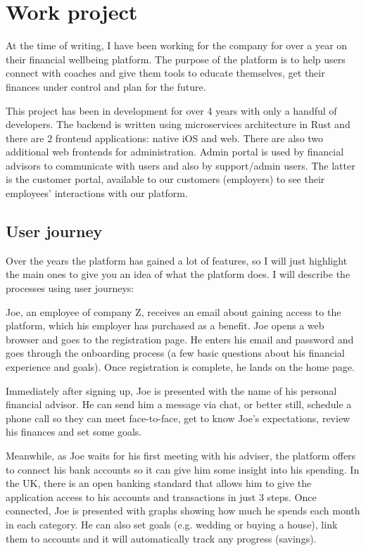 \section{Work project}
At the time of writing, I have been working for the company for over a year on their financial wellbeing platform. The purpose of the platform is to help users connect with coaches and give them tools to educate themselves, get their finances under control and plan for the future.

This project has been in development for over 4 years with only a handful of developers. The backend is written using microservices architecture in Rust and there are 2 frontend applications: native iOS and web. There are also two additional web frontends for administration. Admin portal is used by financial advisors to communicate with users and also by support/admin users. The latter is the customer portal, available to our customers (employers) to see their employees' interactions with our platform.

\subsection{User journey}
Over the years the platform has gained a lot of features, so I will just highlight the main ones to give you an idea of what the platform does. I will describe the processes using user journeys:

\begin{example}[Sign Up]
    Joe, an employee of company Z, receives an email about gaining access to the platform, which his employer has purchased as a benefit. Joe opens a web browser and goes to the registration page. He enters his email and password and goes through the onboarding process (a few basic questions about his financial experience and goals). Once registration is complete, he lands on the home page.
\end{example}

\begin{example}[Advisor]
    Immediately after signing up, Joe is presented with the name of his personal financial advisor. He can send him a message via chat, or better still, schedule a phone call so they can meet face-to-face, get to know Joe's expectations, review his finances and set some goals.
\end{example}

\begin{example}[Analyse]
    Meanwhile, as Joe waits for his first meeting with his adviser, the platform offers to connect his bank accounts so it can give him some insight into his spending. In the UK, there is an open banking standard that allows him to give the application access to his accounts and transactions in just 3 steps. Once connected, Joe is presented with graphs showing how much he spends each month in each category. He can also set goals (e.g. wedding or buying a house), link them to accounts and it will automatically track any progress (savings).
\end{example}

